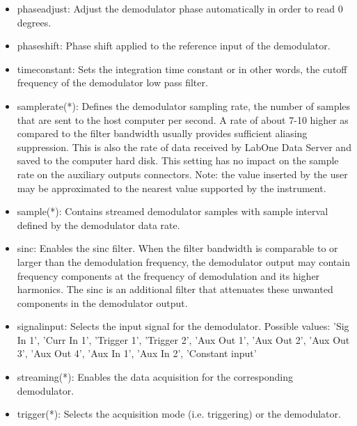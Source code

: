 \documentclass[11pt]{article} %
\begin{document}
\begin{itemize}
	\item phaseadjust: Adjust the demodulator phase automatically in order to read 0 degrees.
	\item phaseshift: Phase shift applied to the reference input of the demodulator. %
	\item timeconstant: Sets the integration time constant or in other words, the cutoff frequency of the demodulator low pass filter.
	\item samplerate(*): Defines the demodulator sampling rate, the number of samples that are sent to the host computer per second. A rate of about 7-10 higher as compared to the filter bandwidth usually provides sufficient aliasing suppression. This is also the rate of data received by LabOne Data Server and saved to the computer hard disk. This setting has no impact on the sample rate on the auxiliary outputs connectors. Note: the value inserted by the user may be approximated to the nearest value supported by the instrument.
	\item sample(*): Contains streamed demodulator samples with sample interval defined by the demodulator data rate.
	\item sinc: Enables the sinc filter. When the filter bandwidth is comparable to or larger than the demodulation frequency, the demodulator output may contain frequency components at the frequency of demodulation and its higher harmonics. The sinc is an additional filter that attenuates these unwanted components in the demodulator output.
	\item signalinput: Selects the input signal for the demodulator. Possible values: 'Sig In 1', 'Curr In 1', 'Trigger 1', 'Trigger 2', 'Aux Out 1', 'Aux Out 2', 'Aux Out 3', 'Aux Out 4', 'Aux In 1', 'Aux In 2', 'Constant input'
	\item streaming(*): Enables the data acquisition for the corresponding demodulator.
	\item trigger(*): Selects the acquisition mode (i.e. triggering) or the demodulator.

\end{itemize}
\end{document}

